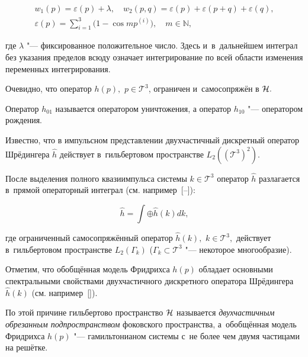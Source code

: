 \begin{gather*}

w_1(p)=\varepsilon(p)+\lambda,\quad w_2(p, q)=\varepsilon(p)+\varepsilon(p+q)+\varepsilon(q),

\\

\varepsilon(p)=\sum_{i=1}^3 \bigl(1-\cos m p^{(i)}\bigr),\quad  m\in {\mathbb N},

\end{gather*}

где $\lambda$ "--- фиксированное положительное число. Здесь и~в~дальнейшем интеграл без указания пределов всюду означает интегрирование по всей области изменения переменных интегрирования.



Очевидно, что оператор $h(p),$ $p\in {\mathcal T}^3$, ограничен и~самосопряжён в ${\cal H}.$



Оператор $h_{01}$ называется оператором уничтожения, а оператор $h_{10}$ "--- оператором рождения.



Известно, что в импульсном представлении двухчастичный дискретный оператор Шрёдингера $\hat{h}$ действует в~гильбертовом пространстве $L_2(({\mathcal T}^3)^2).$ 

После выделения полного квазиимпульса системы $k \in {\mathcal T}^3$ оператор $\hat{h}$ разлагается в~прямой операторный  интеграл (см. например~[--]):

$$

\hat{h}=\int \oplus \hat{h}(k)dk,

$$

где ограниченный самосопряжённый оператор $\hat{h}(k),$ $k \in {\mathcal T}^3,$ действует в~гильбертовом пространстве $L_2(\Gamma_k)$ ($\Gamma_k \subset {\mathcal T}^3$ "--- некоторое многообразие).



Отметим, что обобщённая модель Фридрихса $h(p)$ обладает основными спектральными свойствами двухчастичного дискретного оператора Шрёдингера $\hat{h}(k)$ (см. например~[]). 

По этой причине гильбертово пространство ${\cal H}$ называется {\it двухчастичным обрезанным подпространством} фоковского пространства, а~обобщённая модель Фридрихса $h(p)$ "--- гамильтонианом системы с~не более чем двумя частицами на решётке.



